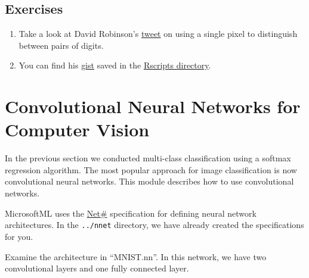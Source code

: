 \documentclass[]{book}
\providecommand{\tightlist}{%
  \setlength{\itemsep}{0pt}\setlength{\parskip}{0pt}}
\theoremstyle{definition}
\theoremstyle{definition}
\theoremstyle{definition}
\theoremstyle{remark}
\begin{document}
\section{Exercises}\label{exercises-1}

\begin{enumerate}
\def\labelenumi{\arabic{enumi}.}
\tightlist
\item
  Take a look at David Robinson's
  \href{https://twitter.com/drob/status/869991240099549185}{tweet} on
  using a single pixel to distinguish between pairs of digits.
\item
  You can find his
  \href{https://gist.github.com/dgrtwo/aaef94ecc6a60cd50322c0054cc04478}{gist}
  saved in the \href{../Rscripts/8-drob-just-a-pixel.R}{Rscripts
  directory}.
\end{enumerate}

\chapter{Convolutional Neural Networks for Computer
Vision}\label{convolutional-neural-networks-for-computer-vision}

In the previous section we conducted multi-class classification using a
softmax regression algorithm. The most popular approach for image
classification is now convolutional neural networks. This module
describes how to use convolutional networks.

MicrosoftML uses the
\href{https://docs.microsoft.com/en-us/azure/machine-learning/machine-learning-azure-ml-netsharp-reference-guide}{Net\#}
specification for defining neural network architectures. In the
\texttt{../nnet} directory, we have already created the specifications
for you.

Examine the architecture in ``MNIST.nn''. In this network, we have two
convolutional layers and one fully connected layer.
\end{document}
